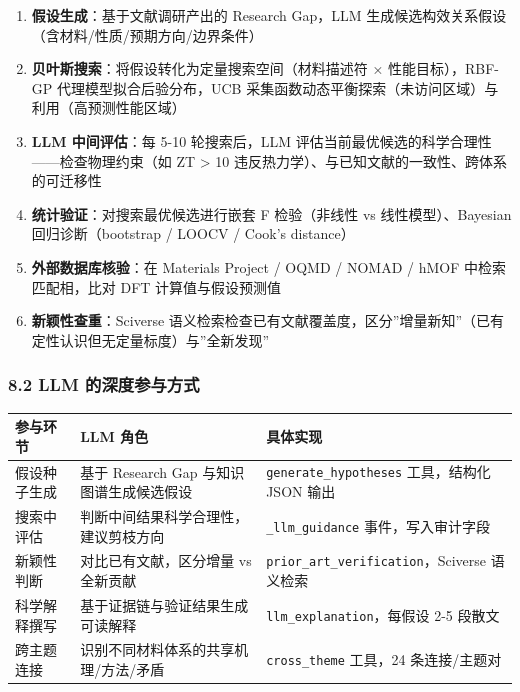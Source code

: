 \documentclass[12pt,a4paper]{ctexart}
\providecommand{\tightlist}{%
  \setlength{\itemsep}{0pt}\setlength{\parskip}{0pt}}
\begin{document}
\begin{enumerate}
\def\labelenumi{\arabic{enumi}.}
\tightlist
\item
  \textbf{假设生成}：基于文献调研产出的 Research Gap，LLM 生成候选构效关系假设（含材料/性质/预期方向/边界条件）
\item
  \textbf{贝叶斯搜索}：将假设转化为定量搜索空间（材料描述符 × 性能目标），RBF-GP 代理模型拟合后验分布，UCB 采集函数动态平衡探索（未访问区域）与利用（高预测性能区域）
\item
  \textbf{LLM 中间评估}：每 5-10 轮搜索后，LLM 评估当前最优候选的科学合理性------检查物理约束（如 ZT \textgreater{} 10 违反热力学）、与已知文献的一致性、跨体系的可迁移性
\item
  \textbf{统计验证}：对搜索最优候选进行嵌套 F 检验（非线性 vs 线性模型）、Bayesian 回归诊断（bootstrap / LOOCV / Cook's distance）
\item
  \textbf{外部数据库核验}：在 Materials Project / OQMD / NOMAD / hMOF 中检索匹配相，比对 DFT 计算值与假设预测值
\item
  \textbf{新颖性查重}：Sciverse 语义检索检查已有文献覆盖度，区分''增量新知''（已有定性认识但无定量标度）与''全新发现''
\end{enumerate}

\subsubsection{8.2 LLM 的深度参与方式}\label{llm-ux7684ux6df1ux5ea6ux53c2ux4e0eux65b9ux5f0f}

{\def\LTcaptype{none} %
\begin{longtable}[]{@{}
  >{\raggedright\arraybackslash}p{}
  >{\raggedright\arraybackslash}p{}
  >{\raggedright\arraybackslash}p{}@{}}
\toprule\noalign{}
\begin{minipage}[b]{\linewidth}\raggedright
参与环节
\end{minipage} & \begin{minipage}[b]{\linewidth}\raggedright
LLM 角色
\end{minipage} & \begin{minipage}[b]{\linewidth}\raggedright
具体实现
\end{minipage} \\
\midrule\noalign{}
\endhead
\bottomrule\noalign{}
\endlastfoot
假设种子生成 & 基于 Research Gap 与知识图谱生成候选假设 & \texttt{generate\_hypotheses} 工具，结构化 JSON 输出 \\
搜索中评估 & 判断中间结果科学合理性，建议剪枝方向 & \texttt{\_llm\_guidance} 事件，写入审计字段 \\
新颖性判断 & 对比已有文献，区分增量 vs 全新贡献 & \texttt{prior\_art\_verification}，Sciverse 语义检索 \\
科学解释撰写 & 基于证据链与验证结果生成可读解释 & \texttt{llm\_explanation}，每假设 2-5 段散文 \\
跨主题连接 & 识别不同材料体系的共享机理/方法/矛盾 & \texttt{cross\_theme} 工具，24 条连接/主题对 \\
\end{longtable}
}
\end{document}
